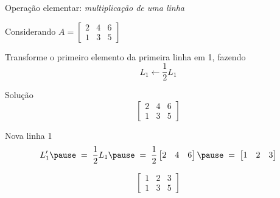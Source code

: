 \begin{question}
Operação elementar: \emph{multiplicação de uma linha}

Considerando
\(
  A =
  \begin{bmatrix}
    2 & 4 & 6 \\
    1 & 3 & 5
  \end{bmatrix}
\)

Transforme o primeiro elemento da primeira linha em 1, fazendo
\[
  L_1 \leftarrow \frac{1}{2} L_1
\]
\end{question}

\begin{resolution}{Solução}
\[
  \begin{bmatrix}
  2 & 4 & 6 \\
  1 & 3 & 5
  \end{bmatrix}
\]

\pause
Nova linha 1
\[
  L'_1
  \pause
  \;=\;
  \frac{1}{2} L_1
  \pause
  \;=\;
  \frac{1}{2}
  \begin{bmatrix}
    2 & 4 & 6 \\
  \end{bmatrix}
  \pause
  \;=\;
  \begin{bmatrix}
    1 & 2 & 3 \\
  \end{bmatrix}
\]

\pause
\[
  \begin{bmatrix}
  1 & 2 & 3 \\
  1 & 3 & 5
  \end{bmatrix}
\]
\end{resolution}

